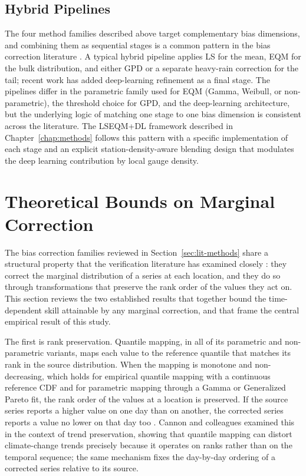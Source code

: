 \subsection{Hybrid Pipelines}\label{sec:lit-hybrid}

The four method families described above target complementary
bias dimensions, and combining them as sequential stages is a
common pattern in the bias correction literature
\citep{ref:maraun2016}. A typical hybrid pipeline applies LS for
the mean, EQM for the bulk distribution, and either GPD or a
separate heavy-rain correction for the tail; recent work has
added deep-learning refinement as a final stage. The pipelines
differ in the parametric family used for EQM (Gamma, Weibull,
or non-parametric), the threshold choice for GPD, and the
deep-learning architecture, but the underlying logic of
matching one stage to one bias dimension is consistent across
the literature. The LSEQM+DL framework described in
Chapter~\ref{chap:methods} follows this pattern with a specific
implementation of each stage and an explicit
station-density-aware blending design that modulates the deep
learning contribution by local gauge density.


\section{Theoretical Bounds on Marginal Correction}\label{sec:lit-bounds}

The bias correction families reviewed in
Section~\ref{sec:lit-methods} share a structural property that
the verification literature has examined closely
\citep{ref:maraun2016}: they correct
the marginal distribution of a series at each location, and they
do so through transformations that preserve the rank order of
the values they act on. This section reviews the two established
results that together bound the time-dependent skill attainable by
any marginal correction, and that frame the central empirical
result of this study.

The first is rank preservation. Quantile mapping, in all of its
parametric and non-parametric variants, maps each value to the
reference quantile that matches its rank in the source
distribution. When the mapping is monotone and non-decreasing, which
holds for empirical quantile mapping with a continuous reference
CDF and for parametric mapping through a Gamma or Generalized
Pareto fit, the rank order of the values at a location is
preserved. If the source series reports a higher value
on one day than on another, the corrected series reports a value
no lower on that day too
\citep{ref:cannon2015}. Cannon and colleagues examined this in the
context of trend preservation, showing that quantile mapping can
distort climate-change trends precisely because it operates on
ranks rather than on the temporal sequence; the same mechanism
fixes the day-by-day ordering of a corrected series relative to its
source.

